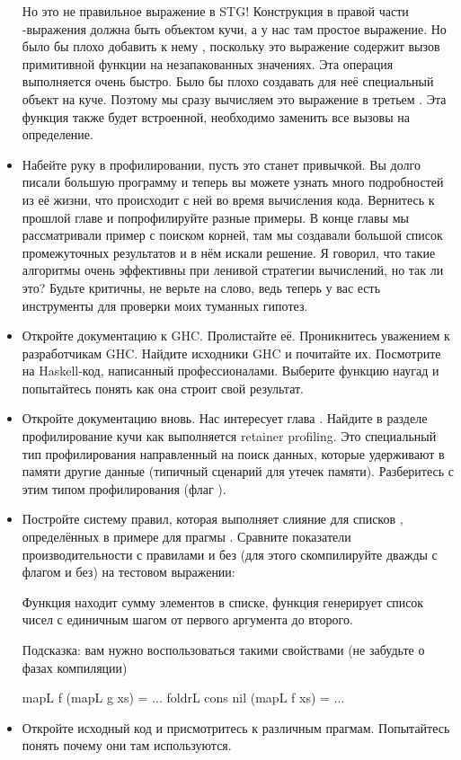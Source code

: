 \begin{itemize}
  Но это не правильное выражение в STG! Конструкция в правой части
  -выражения должна быть объектом кучи, а у нас там простое
  выражение. Но было бы плохо добавить к нему , поскольку это
  выражение содержит вызов примитивной функции на незапакованных
  значениях. Эта операция выполняется очень быстро. Было бы плохо
  создавать для неё специальный объект на куче. Поэтому мы сразу
  вычисляем это выражение в третьем . Эта функция также будет
  встроенной, необходимо заменить все вызовы на определение.
\item
  Набейте руку в профилировании, пусть это станет привычкой. Вы долго
  писали большую программу и теперь вы можете узнать много подробностей
  из её жизни, что происходит с ней во время вычисления кода. Вернитесь
  к прошлой главе и попрофилируйте разные примеры. В конце главы мы
  рассматривали пример с поиском корней, там мы создавали большой список
  промежуточных результатов и в нём искали решение. Я говорил, что такие
  алгоритмы очень эффективны при ленивой стратегии вычислений, но так ли
  это? Будьте критичны, не верьте на слово, ведь теперь у вас есть
  инструменты для проверки моих туманных гипотез.
\item
  Откройте документацию к GHC. Пролистайте её. Проникнитесь уважением к
  разработчикам GHC. Найдите исходники GHC и почитайте их. Посмотрите на
  Haskell-код, написанный профессионалами. Выберите функцию наугад и
  попытайтесь понять как она строит свой результат.
\item
  Откройте документацию вновь. Нас интересует глава .
  Найдите в разделе профилирование кучи как выполняется retainer
  profiling. Это специальный тип профилирования направленный на поиск
  данных, которые удерживают в памяти другие данные (типичный сценарий
  для утечек памяти). Разберитесь с этим типом профилирования (флаг
  ).
\item
  Постройте систему правил, которая выполняет слияние для списков
  , определённых в примере для прагмы . Сравните
  показатели производительности с правилами и без (для этого
  скомпилируйте дважды с флагом  и без) на тестовом выражении:



  Функция  находит сумму элементов в списке, функция 
  генерирует список чисел с единичным шагом от первого аргумента до
  второго.

  Подсказка: вам нужно воспользоваться такими свойствами (не забудьте о
  фазах компиляции)


  \begin{code}
  mapL f (mapL g xs)              = ...
  foldrL cons nil (mapL f xs)     = ...     
  \end{code}
\item
  Откройте исходный код  и присмотритесь к различным
  прагмам. Попытайтесь понять почему они там используются.
\end{itemize}
